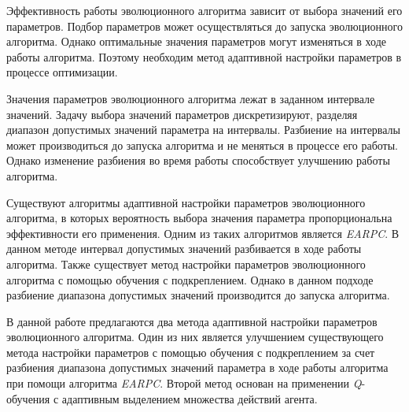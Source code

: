 \startprefacepage

Эффективность работы эволюционного алгоритма зависит от выбора значений его параметров. Подбор параметров может осуществляться до запуска эволюционного алгоритма. Однако оптимальные значения параметров могут изменяться в ходе работы алгоритма. Поэтому необходим метод адаптивной настройки параметров в процессе оптимизации. 

Значения параметров эволюционного алгоритма лежат в заданном интервале значений. Задачу выбора значений параметров дискретизируют, разделяя диапазон допустимых значений параметра на интервалы. Разбиение на интервалы может производиться до запуска алгоритма и не меняться в процессе его работы. Однако изменение разбиения во время работы способствует улучшению работы алгоритма.

Существуют алгоритмы адаптивной настройки параметров эволюционного алгоритма, в которых вероятность выбора значения параметра пропорциональна эффективности его применения. Одним из таких алгоритмов является \textit{EARPC}. В данном методе интервал допустимых значений разбивается в ходе работы алгоритма. Также существует метод настройки параметров эволюционного алгоритма с помощью обучения с подкреплением. Однако в данном подходе разбиение диапазона допустимых значений производится до запуска алгоритма. 

В данной работе предлагаются два метода адаптивной настройки параметров эволюционного алгоритма. Один из них является улучшением существующего метода настройки параметров с помощью обучения с подкреплением за счет разбиения диапазона допустимых значений параметра в ходе работы алгоритма при помощи алгоритма \textit{EARPC}. Второй метод основан на применении  \textit{Q}-обучения с адаптивным выделением множества действий агента. 